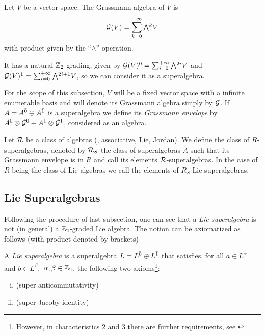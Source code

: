 \begin{defi}\label{def:Grassmann-algebra}
Let $V$ be a vector space. The Grassmann algebra of $V$ is
%
\[\mc G(V) = \sum_{k=0}^{+\infty} \Exterior^k V\]
%
with product given by the ``$\wedge$'' operation.

It has a natural $\mathbb{Z}_{2}$-grading, given by $\mc G(V)\even = \sum_{i=0}^{+\infty}\Exterior^{2i} V$ and $\mc G(V)\odd = \sum_{i=0}^{+\infty}\Exterior^{2i+1} V$, so we can consider it as a superalgebra.
\end{defi}

For the scope of this subsection, $V$ will be a fixed vector space with a infinite enumerable basis and will denote its Grassmann algebra simply by $\mathcal G$. If $A=A^{\bar0}\oplus A^{\bar1}$ is a superalgebra we define its \emph{Grassmann envelope} by $A^{\bar0}\otimes \mathcal G^{\bar0} + A^{\bar1}\otimes \mathcal G^{\bar1}$, considered as an algebra.

Let $\mathcal R$ be a class of algebras (\eg, associative, Lie, Jordan). We define the class of $R$-superalgebras, denoted by $\mathcal R_S$ the class of superalgebras $A$ such that its Grassmann envelope is in $R$ and call its elements $\mathcal R$-superalgebras. In the case of $R$ being the class of Lie algebras we call the elements of $R_S$ Lie superalgebras.


\subsection{Lie Superalgebras}
Following the procedure of last subsection, one can see that a \emph{Lie superalgebra} is not (in general) a $\mathbb{Z}_{2}$-graded Lie algebra. The notion can be axiomatized as follows (with product denoted by brackets)

\begin{defi}
A \emph{Lie superalgebra} is a superalgebra $L=L^{\bar0}\oplus L^{\bar1}$ that satisfies, for all $a \in L^{\alpha}$ and $b \in L^{\beta}$, $\,\alpha,\beta\in\mathbb{Z}_{2}$, the following two axioms\footnote{However, in characteristics  2 and 3 there are further requirements, see \cite[Subsection 1.2]{MR1192546} }:

\begin{enumerate}[(i)]
 \item {}(super anticommutativity)
 \item {}(super Jacoby identity)
\end{enumerate}
\end{defi}

